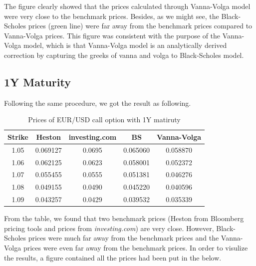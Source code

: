 \noindent
The figure clearly showed that the prices calculated through Vanna-Volga model were very close to the benchmark prices. Besides, as we might see, the Black-Scholes prices (green line) were far away from the benchmark prices compared to Vanna-Volga prices. This figure was consistent with the purpose of the Vanna-Volga model, which is that Vanna-Volga model is an analytically derived correction by capturing the greeks of vanna and volga to Black-Scholes model.

\subsection{1Y Maturity}

Following the same procedure, we got the result as following.

\begin{table}[htb]
	\centering
	\caption{Prices of EUR/USD call option with 1Y matiruty}
	\begin{tabular}{ccccc}
		\hline \hline
		Strike & Heston & investing.com & BS & Vanna-Volga \\ [0.5ex]
		\hline
		1.05 &	0.069127&	0.0695&	0.065060&	0.058870 \\ 
		1.06&	0.062125&	0.0623	&0.058001&	0.052372\\
		1.07&	0.055455&	0.0555&	0.051381&	0.046276 \\
		1.08&	0.049155&	0.0490	&0.045220&	0.040596\\
		1.09&	0.043257&	0.0429	&0.039532&	0.035339 \\ [0.5ex]
		\hline
	\end{tabular}
	\label{table:prices-1Y}
\end{table}
\noindent
From the table, we found that two benchmark prices (Heston from Bloomberg pricing tools and prices from \textit{investing.com}) are very close. However, Black-Scholes prices were much far away from the benchmark prices and the Vanna-Volga prices were even far away from the benchmark prices. In order to visulize the results, a figure contained all the prices had been put in the below.


